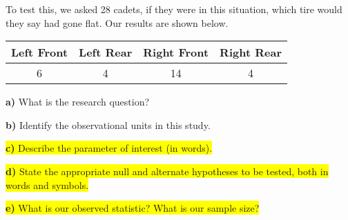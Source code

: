 \documentclass{article}
\newif\ifPrintSolution
\newcommand{\sol}[1]{\ifPrintSolution {\color{blue} #1 } \fi}
\begin{document}
To test this, we asked 28 cadets, if they were in this situation, which tire would they say had gone flat. Our results are shown below.

\begin{table*}[htbp]
\begin{center}
\begin{tabular}{|c|c|c|c|}

\hline
\textbf{Left Front} & \textbf{Left Rear} & \textbf{Right Front} & \textbf{Right Rear}\\
\hline
6 & 4 & 14 & 4\\
\hline
\end{tabular}
\end{center}
\end{table*}


\hspace{0.1in} \textbf{a) } What is the research question?

\sol{Do cadets pick the right front tire more often than other tires?}

\vspace{.25in}

\hspace{0.1in} \textbf{b) } Identify the observational units in this study.

\sol{Each of the 28 cadets asked}

\vspace{.25in}

\hspace{0.1in} \colorbox{yellow}{\textbf{c) }Describe the parameter of interest (in words).}

\sol{The parameter $\pi$ is the long run proportion of cadets who choose the right front tire.}

\vspace{.25in}

\hspace{0.1in} \colorbox{yellow}{\textbf{d) }State the appropriate null and alternate hypotheses to be tested, both in words and symbols.}

\sol{$H_0: \pi = \frac{1}{4}$ - Our null hypothesis is that the long run proportion of cadets who choose the right front tire is one out of four.\\
$H_a: \pi > \frac{1}{4}$ - Our alternate hypothesis is that the long run proportion of cadets who choose the right front tire is greater than one in four}


\vspace{.25in}

\hspace{0.1in} \colorbox{yellow}{\textbf{e) }What is our observed statistic? What is our sample size?}
\end{document}

